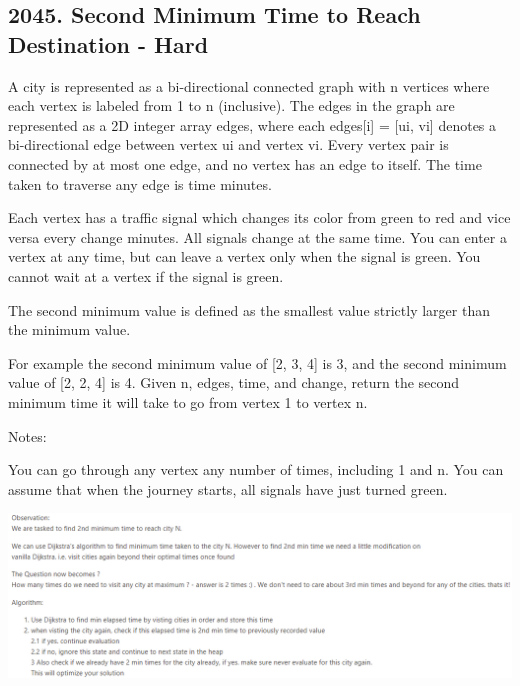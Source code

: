 \documentclass[9pt, b5paaper]{book}
\begin{document}
\subsection{2045. Second Minimum Time to Reach Destination - Hard}
\label{sec-1-1-3}
A city is represented as a bi-directional connected graph with n vertices where each vertex is labeled from 1 to n (inclusive). The edges in the graph are represented as a 2D integer array edges, where each edges[i] = [ui, vi] denotes a bi-directional edge between vertex ui and vertex vi. Every vertex pair is connected by at most one edge, and no vertex has an edge to itself. The time taken to traverse any edge is time minutes.

Each vertex has a traffic signal which changes its color from green to red and vice versa every change minutes. All signals change at the same time. You can enter a vertex at any time, but can leave a vertex only when the signal is green. You cannot wait at a vertex if the signal is green.

The second minimum value is defined as the smallest value strictly larger than the minimum value.

For example the second minimum value of [2, 3, 4] is 3, and the second minimum value of [2, 2, 4] is 4.
Given n, edges, time, and change, return the second minimum time it will take to go from vertex 1 to vertex n.

Notes:

You can go through any vertex any number of times, including 1 and n.
You can assume that when the journey starts, all signals have just turned green.

\includegraphics[width=.9\linewidth]{./pic/redGreen.png}
\end{document}
